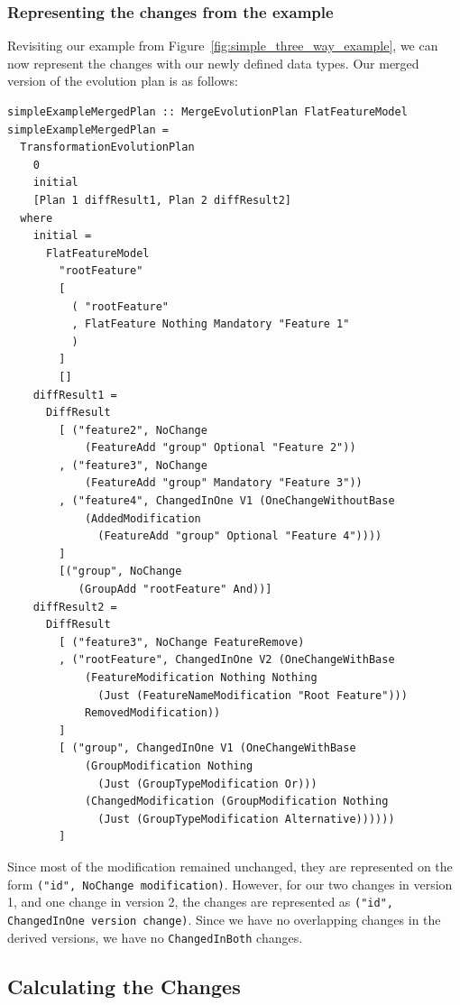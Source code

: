 \documentclass[a4paper,english]{ifimaster}
\begin{document}
\subsubsection{Representing the changes from the example}%
\label{ssub:representing_the_changes_from_the_example}

Revisiting our example from Figure~\ref{fig:simple_three_way_example}, we can now represent the changes with our newly defined data types. Our merged version of the evolution plan is as follows:

\begin{verbatim}
simpleExampleMergedPlan :: MergeEvolutionPlan FlatFeatureModel
simpleExampleMergedPlan =
  TransformationEvolutionPlan
    0
    initial
    [Plan 1 diffResult1, Plan 2 diffResult2]
  where
    initial =
      FlatFeatureModel
        "rootFeature"
        [
          ( "rootFeature"
          , FlatFeature Nothing Mandatory "Feature 1"
          )
        ]
        []
    diffResult1 =
      DiffResult
        [ ("feature2", NoChange 
            (FeatureAdd "group" Optional "Feature 2"))
        , ("feature3", NoChange
            (FeatureAdd "group" Mandatory "Feature 3"))
        , ("feature4", ChangedInOne V1 (OneChangeWithoutBase 
            (AddedModification 
              (FeatureAdd "group" Optional "Feature 4"))))
        ]
        [("group", NoChange 
           (GroupAdd "rootFeature" And))]
    diffResult2 =
      DiffResult
        [ ("feature3", NoChange FeatureRemove)
        , ("rootFeature", ChangedInOne V2 (OneChangeWithBase 
            (FeatureModification Nothing Nothing 
              (Just (FeatureNameModification "Root Feature"))) 
            RemovedModification))
        ]
        [ ("group", ChangedInOne V1 (OneChangeWithBase 
            (GroupModification Nothing 
              (Just (GroupTypeModification Or))) 
            (ChangedModification (GroupModification Nothing 
              (Just (GroupTypeModification Alternative))))))
        ]
\end{verbatim}

Since most of the modification remained unchanged, they are represented on the form \texttt{("id", NoChange modification)}. However, for our two changes in version 1, and one change in version 2, the changes are represented as \texttt{("id", ChangedInOne version change)}. Since we have no overlapping changes in the derived versions, we have no \texttt{ChangedInBoth} changes.

\subsection{Calculating the Changes}%
\label{sub:calculating_the_changes}
\end{document}
